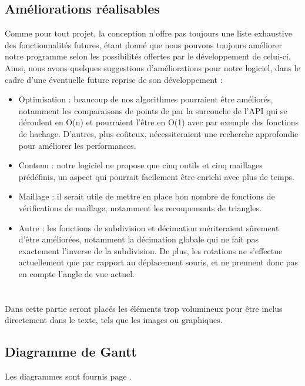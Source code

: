 \documentclass[a4paper]{memoir}
\begin{document}
		\section{Améliorations réalisables}
			Comme pour tout projet, la conception n'offre pas toujours une liste exhaustive des fonctionnalités futures, étant donné que nous pouvons 
			toujours améliorer notre programme selon les possibilités offertes par le développement de celui-ci. Ainsi, nous avons quelques suggestions 
			d'améliorations pour notre logiciel, dans le cadre d'une éventuelle future reprise de son développement :
			\begin{itemize}
				\item Optimisation : beaucoup de nos algorithmes pourraient être améliorés, notamment les comparaisons de points de par la surcouche de 
				l'API qui se déroulent en O(n) et pourraient l'être en O(1) avec par exemple des fonctions de hachage. D'autres, plus coûteux, 
				nécessiteraient une recherche approfondie pour améliorer les performances.
				\item Contenu : notre logiciel ne propose que cinq outils et cinq maillages prédéfinis, un aspect qui pourrait facilement être enrichi 
				avec plus de temps.
				\item Maillage : il serait utile de mettre en place bon nombre de fonctions de vérifications de maillage, notamment les recoupements 
				de triangles.
				\item Autre : les fonctions de subdivision et décimation mériteraient sûrement d'être améliorées, notamment la décimation globale qui ne
				fait pas exactement l'inverse de la subdivision. De plus, les rotations ne s'effectue actuellement que par rapport au déplacement souris,
				et ne prennent donc pas en compte l'angle de vue actuel.
			\end{itemize}

	\appendix
	\chapter{}
		Dans cette partie seront placés les éléments trop volumineux pour être inclus directement dans le texte, tels que les images ou graphiques.\\
		
		\section{Diagramme de Gantt}
			Les diagrammes sont fournis page \pageref{fig:gantt}.
			
\end{document}
